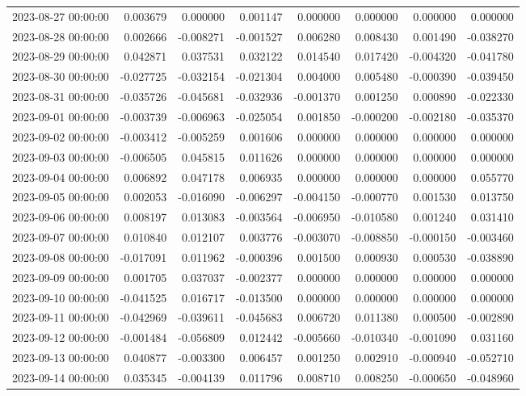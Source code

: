 \begin{tabular}{lrrrrrrr}
2023-08-27 00:00:00 & 0.003679 & 0.000000 & 0.001147 & 0.000000 & 0.000000 & 0.000000 & 0.000000 \\
2023-08-28 00:00:00 & 0.002666 & -0.008271 & -0.001527 & 0.006280 & 0.008430 & 0.001490 & -0.038270 \\
2023-08-29 00:00:00 & 0.042871 & 0.037531 & 0.032122 & 0.014540 & 0.017420 & -0.004320 & -0.041780 \\
2023-08-30 00:00:00 & -0.027725 & -0.032154 & -0.021304 & 0.004000 & 0.005480 & -0.000390 & -0.039450 \\
2023-08-31 00:00:00 & -0.035726 & -0.045681 & -0.032936 & -0.001370 & 0.001250 & 0.000890 & -0.022330 \\
2023-09-01 00:00:00 & -0.003739 & -0.006963 & -0.025054 & 0.001850 & -0.000200 & -0.002180 & -0.035370 \\
2023-09-02 00:00:00 & -0.003412 & -0.005259 & 0.001606 & 0.000000 & 0.000000 & 0.000000 & 0.000000 \\
2023-09-03 00:00:00 & -0.006505 & 0.045815 & 0.011626 & 0.000000 & 0.000000 & 0.000000 & 0.000000 \\
2023-09-04 00:00:00 & 0.006892 & 0.047178 & 0.006935 & 0.000000 & 0.000000 & 0.000000 & 0.055770 \\
2023-09-05 00:00:00 & 0.002053 & -0.016090 & -0.006297 & -0.004150 & -0.000770 & 0.001530 & 0.013750 \\
2023-09-06 00:00:00 & 0.008197 & 0.013083 & -0.003564 & -0.006950 & -0.010580 & 0.001240 & 0.031410 \\
2023-09-07 00:00:00 & 0.010840 & 0.012107 & 0.003776 & -0.003070 & -0.008850 & -0.000150 & -0.003460 \\
2023-09-08 00:00:00 & -0.017091 & 0.011962 & -0.000396 & 0.001500 & 0.000930 & 0.000530 & -0.038890 \\
2023-09-09 00:00:00 & 0.001705 & 0.037037 & -0.002377 & 0.000000 & 0.000000 & 0.000000 & 0.000000 \\
2023-09-10 00:00:00 & -0.041525 & 0.016717 & -0.013500 & 0.000000 & 0.000000 & 0.000000 & 0.000000 \\
2023-09-11 00:00:00 & -0.042969 & -0.039611 & -0.045683 & 0.006720 & 0.011380 & 0.000500 & -0.002890 \\
2023-09-12 00:00:00 & -0.001484 & -0.056809 & 0.012442 & -0.005660 & -0.010340 & -0.001090 & 0.031160 \\
2023-09-13 00:00:00 & 0.040877 & -0.003300 & 0.006457 & 0.001250 & 0.002910 & -0.000940 & -0.052710 \\
2023-09-14 00:00:00 & 0.035345 & -0.004139 & 0.011796 & 0.008710 & 0.008250 & -0.000650 & -0.048960 \\

\end{tabular}
